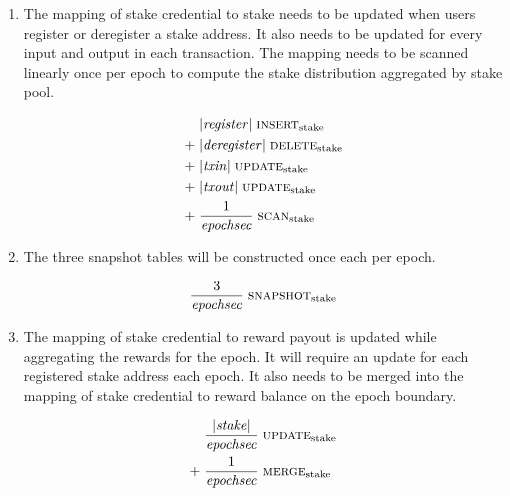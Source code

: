\documentclass[11pt,a4paper]{article}
\begin{document}
\begin{enumerate}
\item The mapping of stake credential to stake needs to be updated when users
      register or deregister a stake address. It also needs to be updated for
      every input and output in each transaction. The mapping needs to be
      scanned linearly once per epoch to compute the stake distribution
      aggregated by stake pool.

      \begin{equation}
      \begin{aligned}
            & |\mathit{register}| \; \text{{\sc insert}}_\text{stake} \\
       + \; & |\mathit{deregister}| \; \text{{\sc delete}}_\text{stake} \\
       + \; & |\mathit{txin}| \; \text{{\sc update}}_\text{stake} \\
       + \; & |\mathit{txout}| \; \text{{\sc update}}_\text{stake} \\
       + \; & \frac{1}{\mathit{epochsec}} \; \text{{\sc scan}}_\text{stake} \\
      \end{aligned}
      \end{equation}

\item The three snapshot tables will be constructed once each per epoch.

      \begin{equation}
      \begin{aligned}
            \frac{3}{\mathit{epochsec}} \; \text{{\sc snapshot}}_\text{stake} \\
      \end{aligned}
      \end{equation}

\item The mapping of stake credential to reward payout is updated while
      aggregating the rewards for the epoch. It will require an update for each
      registered stake address each epoch. It also needs to be merged into the
      mapping of stake credential to reward balance on the epoch boundary.

      \begin{equation}
      \begin{aligned}
            & \frac{|\mathit{stake}|}{\mathit{epochsec}} \; \text{{\sc update}}_\text{stake} \\
       + \; & \frac{1}{\mathit{epochsec}} \; \text{{\sc merge}}_\text{stake} \\
      \end{aligned}
      \end{equation}

\end{enumerate}
\end{document}
